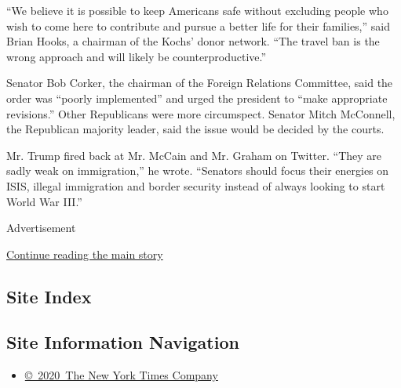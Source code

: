 ``We believe it is possible to keep Americans safe without excluding
people who wish to come here to contribute and pursue a better life for
their families,'' said Brian Hooks, a chairman of the Kochs' donor
network. ``The travel ban is the wrong approach and will likely be
counterproductive.''

Senator Bob Corker, the chairman of the Foreign Relations Committee,
said the order was ``poorly implemented'' and urged the president to
``make appropriate revisions.'' Other Republicans were more circumspect.
Senator Mitch McConnell, the Republican majority leader, said the issue
would be decided by the courts.

Mr. Trump fired back at Mr. McCain and Mr. Graham on Twitter. ``They are
sadly weak on immigration,'' he wrote. ``Senators should focus their
energies on ISIS, illegal immigration and border security instead of
always looking to start World War III.''

Advertisement

\protect\hyperlink{after-bottom}{Continue reading the main story}

\hypertarget{site-index}{%
\subsection{Site Index}\label{site-index}}

\hypertarget{site-information-navigation}{%
\subsection{Site Information
Navigation}\label{site-information-navigation}}

\begin{itemize}
\tightlist
\item
  \href{https://help.nytimes3xbfgragh.onion/hc/en-us/articles/115014792127-Copyright-notice}{©~2020~The
  New York Times Company}
\end{itemize}

